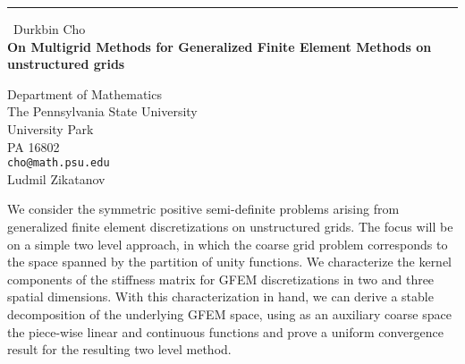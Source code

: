 \documentclass{report}
\begin{document}
\begin{center}
\rule{6in}{1pt} \
{\large Durkbin Cho \\
{\bf On Multigrid Methods for Generalized Finite Element Methods on unstructured grids}}

Department of Mathematics \\ The Pennsylvania State University \\ University Park \\ PA 16802
\\
{\tt cho@math.psu.edu}\\
Ludmil Zikatanov\end{center}

We consider the symmetric positive semi-definite problems arising from
generalized finite element discretizations on unstructured grids. The
focus will be on a simple two level approach, in which the coarse grid
problem corresponds to the space spanned by the partition of unity
functions. We characterize the kernel components of the stiffness matrix
for GFEM discretizations in two and three spatial dimensions. With this
characterization in hand, we can derive a stable decomposition of the
underlying GFEM space, using as an auxiliary coarse space the piece-wise
linear and continuous functions and prove a uniform convergence result
for the resulting two level method.
\end{document}
